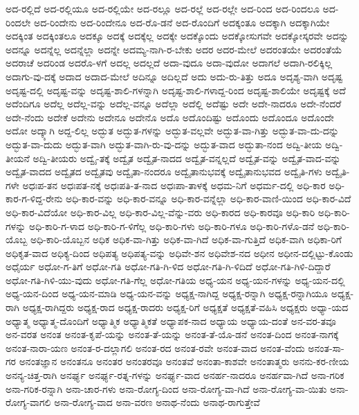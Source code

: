 {ಅದ-ರಲ್ಲಿದೆ
ಅದ-ರಲ್ಲಿಯೂ
ಅದ-ರಲ್ಲಿಯೇ
ಅದ-ರಲ್ಲೂ
ಅದ-ರಲ್ಲೆ
ಅದ-ರಲ್ಲೇ
ಅದ-ರಿಂದ
ಅದ-ರಿಂದಲೂ
ಅದ-ರಿಂದಲೇ
ಅದ-ರಿಂದೇನು
ಅದ-ರಿಂದೇನೂ
ಅದ-ರೊ-ಡನೆ
ಅದ-ರೊಂದಿಗೆ
ಅದಕ್ಕಂತೂ
ಅದಕ್ಕಾಗಿ
ಅದಕ್ಕಾಗಿಯೇ
ಅದಕ್ಕಿಂತ
ಅದಕ್ಕಿಂತಲೂ
ಅದಕ್ಕೂ
ಅದಕ್ಕೆ
ಅದಕ್ಕೆಲ್ಲ
ಅದಕ್ಕೇ
ಅದಕ್ಕೊಂದು
ಅದಕ್ಕೋಸುಗವೇ
ಅದಕ್ಕೋಸ್ಕರವೇ
ಅದನ್ನು
ಅದನ್ನೂ
ಅದನ್ನೆಲ್ಲ
ಅದನ್ನೆಲ್ಲಾ
ಅದನ್ನೇ
ಅದಮ್ಯ-ನಾಗಿ-ರ-ಬೇಕು
ಅದರ
ಅದರ-ಮೇಲೆ
ಅದರಂತಯೇ
ಅದರಂತೆಯೆ
ಅದರಾಚೆ
ಅದರಿಂಡ
ಅದರೊ-ಳಗೆ
ಅದಲ್ಲ
ಅದಲ್ಲದೆ
ಅದಾ-ವುದೂ
ಅದಾ-ವುದೋ
ಅದಾಗಲೆ
ಅದಾಗಿ-ರಲಿಕ್ಕಿಲ್ಲ
ಅದಾಗು-ವು-ದಕ್ಕೆ
ಅದಾದ
ಅದಾದ-ಮೇಲೆ
ಅದಿನ್ನೂ
ಅದಿಲ್ಲದೆ
ಅದು
ಅದು-ರು-ತಿತ್ತು
ಅದೂ
ಅದೃಶ್ಯ-ವಾಗಿ
ಅದೃಷ್ಟ
ಅದೃಷ್ಟ-ದಲ್ಲಿ
ಅದೃಷ್ಟ-ವನ್ನು
ಅದೃಷ್ಟ-ಶಾಲಿ-ಗಳನ್ನಾಗಿ
ಅದೃಷ್ಟ-ಶಾಲಿ-ಗಳಾದ್ದ-ರಿಂದ
ಅದೃಷ್ಟ-ಶಾಲಿಯೇ
ಅದೃಷ್ಟಕ್ಕೆ
ಅದೆ
ಅದೆಂದಿಗೂ
ಅದೆಲ್ಲ
ಅದೆಲ್ಲ-ವನ್ನು
ಅದೆಲ್ಲ-ವನ್ನೂ
ಅದೆಲ್ಲಾ
ಅದೆಲ್ಲಿ
ಅದೆಷ್ಟು
ಅದೇ
ಅದೇ-ನಾದರೂ
ಅದೇ-ನೆಂದರೆ
ಅದೇ-ನೆಂದು
ಅದೇಕೆ
ಅದೇನು
ಅದೇನೂ
ಅದೇನೊ
ಅದೊ
ಅದೊಂದಿಷ್ಟು
ಅದೊಂದು
ಅದೊಂದೂ
ಅದೊಂದೇ
ಅದೋ
ಅದ್ಕ್ಕಾಗಿ
ಅದ್ದ-ಲಿಲ್ಲ
ಅದ್ಭುತ
ಅದ್ಭುತ-ಗಳನ್ನು
ಅದ್ಭುತ-ವಲ್ಲವೇ
ಅದ್ಭುತ-ವಾ-ಗಿತ್ತು
ಅದ್ಭುತ-ವಾ-ದು-ದನ್ನು
ಅದ್ಭುತ-ವಾ-ದುದು
ಅದ್ಭುತ-ವಾಗಿ
ಅದ್ಭುತ-ವಾಗಿ-ರು-ವು-ದನ್ನು
ಅದ್ಭುತ-ವಾದ
ಅದ್ಭುತಾ-ನಂದ
ಅದ್ವಿ-ತೀಯ
ಅದ್ವಿ-ತೀಯನೆ
ಅದ್ವಿ-ತೀಯರು
ಅದ್ವೈ-ತಕ್ಕೆ
ಅದ್ವೈತ
ಅದ್ವೈತ-ನಾದದ
ಅದ್ವೈತ-ವನ್ನಲ್ಲದೆ
ಅದ್ವೈತ-ವನ್ನು
ಅದ್ವೈತ-ವಾದ-ವನ್ನು
ಅದ್ವೈತ-ವಾದದ
ಅದ್ವೈತದ
ಅದ್ವೈತವು
ಅದ್ವೈತಾ-ನಂದರೂ
ಅದ್ವೈತಾನುಭವಕ್ಕೆ
ಅದ್ವೈತಾನುಭವದ
ಅದ್ವೈತಿ-ಗಳು
ಅದ್ವೈತಿ-ಗಳೇ
ಅಧಃಪ-ತನ
ಅಧಃಪತ-ನಕ್ಕೆ
ಅಧಃಪತಿ-ತ-ನಾದ
ಅಧಃಪಾ-ತಾಳಕ್ಕೆ
ಅಧಮ-ನಿಗೆ
ಅಧರ್ಮ-ದಲ್ಲಿ
ಅಧಿ-ಕಾರ
ಅಧಿ-ಕಾರ-ಗ-ಳಿದ್ದ-ರೇನು
ಅಧಿ-ಕಾರ-ವನ್ನು
ಅಧಿ-ಕಾರ-ವನ್ನೂ
ಅಧಿ-ಕಾರ-ವನ್ನೆಲ್ಲಾ
ಅಧಿ-ಕಾರ-ವಾಣಿ-ಯಿಂದ
ಅಧಿ-ಕಾರ-ವಿದೆ
ಅಧಿ-ಕಾರ-ವಿದೆಯೋ
ಅಧಿ-ಕಾರ-ವಿಲ್ಲ
ಅಧಿ-ಕಾರ-ವಿಲ್ಲ-ವೆನ್ನು-ವರು
ಅಧಿ-ಕಾರದ
ಅಧಿ-ಕಾರವೂ
ಅಧಿ-ಕಾರಿ
ಅಧಿ-ಕಾರಿ-ಗಳನ್ನು
ಅಧಿ-ಕಾರಿ-ಗ-ಳಾದ
ಅಧಿ-ಕಾರಿ-ಗ-ಳಿಗೆಲ್ಲ
ಅಧಿ-ಕಾರಿ-ಗಳು
ಅಧಿ-ಕಾರಿ-ಗಳೂ
ಅಧಿ-ಕಾರಿ-ಗಳೊ-ಡನೆ
ಅಧಿ-ಕಾರಿ-ಯೊಬ್ಬ
ಅಧಿ-ಕಾರಿ-ಯೊಬ್ಬನ
ಅಧಿಕ
ಅಧಿಕ-ವಾ-ಗಿತ್ತು
ಅಧಿಕ-ವಾ-ಗಿದೆ
ಅಧಿಕ-ವಾ-ಗುತ್ತಿದೆ
ಅಧಿಕ-ವಾಗಿ
ಅಧಿಕಾ-ರಿಗೆ
ಅಧಿಕೃತ-ವಾದ
ಅಧಿಕ್ಯ-ದಿಂದ
ಅಧಿಪತ್ಯ
ಅಧಿಪತ್ಯ-ವನ್ನು
ಅಧಿವೇ-ಶನ
ಅಧಿವೇಶ-ನದ
ಅಧೀನ
ಅಧೀನ-ದಲ್ಲಿಟ್ಟು-ಕೊಂಡು
ಅಧೈರ್ಯ
ಅಧೋ-ಗ-ತಿಗೆ
ಅಧೋ-ಗತಿ
ಅಧೋ-ಗತಿ-ಗಿ-ಳಿದ
ಅಧೋ-ಗತಿ-ಗಿ-ಳಿದಿದೆ
ಅಧೋ-ಗತಿ-ಗಿಳಿ-ದಿದ್ದಾರೆ
ಅಧೋ-ಗತಿ-ಗಿಳಿ-ಯು-ವುದು
ಅಧೋ-ಗತಿ-ಗೆಲ್ಲ
ಅಧೋ-ಗತಿಯ
ಅಧ್ಯ-ಯನ
ಅಧ್ಯ-ಯನ-ಗಳನ್ನು
ಅಧ್ಯ-ಯನ-ದಲ್ಲಿ
ಅಧ್ಯ-ಯನ-ದಿಂದ
ಅಧ್ಯ-ಯನ-ಮಾಡಿ
ಅಧ್ಯ-ಯನ-ವನ್ನು
ಅಧ್ಯಕ್ಷ-ನಾಗಿದ್ದ
ಅಧ್ಯಕ್ಷ-ರನ್ನಾಗಿ
ಅಧ್ಯಕ್ಷ-ರನ್ನಾಗಿಯೂ
ಅಧ್ಯಕ್ಷ-ರಾಗಿ
ಅಧ್ಯಕ್ಷ-ರಾಗಿದ್ದರು
ಅಧ್ಯಕ್ಷ-ರಾದ
ಅಧ್ಯಕ್ಷ-ರಾದರು
ಅಧ್ಯಕ್ಷ-ರಿಗೆ
ಅಧ್ಯಕ್ಷತೆ
ಅಧ್ಯಕ್ಷತೆ-ವಹಿಸಿ
ಅಧ್ಯಕ್ಷರು
ಅಧ್ಯಾ-ಯದ
ಅಧ್ಯಾತ್ಮ
ಅಧ್ಯಾತ್ಮ-ದೊಂದಿಗೆ
ಅಧ್ಯಾತ್ಮಿಕ
ಅಧ್ಯಾತ್ಮಿಕತೆ
ಅಧ್ಯಾಪಕ-ನಾದ
ಅಧ್ಯಾಯ
ಅಧ್ಯಾಯ-ದಂತೆ
ಅನ-ವರ-ತವೂ
ಅನ-ವರತ
ಅನಂತ
ಅನಂತ-ಕೃಪೆ-ಯನ್ನು
ಅನಂತ-ತೆ-ಯನ್ನು
ಅನಂತ-ತೆ-ಯೊ-ಡನೆ
ಅನಂತ-ದಿಂದ
ಅನಂತ-ನಾಗಕ್ಕೆ
ಅನಂತ-ನಾರಾ-ಯಣ
ಅನಂತ-ರ-ದಲ್ಲಾಗಲಿ
ಅನಂತ-ರದ
ಅನಂತ-ರವೇ
ಅನಂತ-ವಾದ
ಅನಂತ-ವೆಂದು
ಅನಂತ-ಸಾ-ಗರ
ಅನಂತಜ್ಞಾನ
ಅನಂತನೂ
ಅನಂತರ
ಅನಂತರವೂ
ಅನಂತವೆ
ಅನಂತಾ-ಕಾಶವೇ
ಅನಂತಾತ್ಮರು
ಅನನು-ಕರ-ಣೀಯ
ಅನನ್ಯ-ಚಿತ್ತ-ರಾಗಿ
ಅನರ್ಘ್ಯ
ಅನರ್ಘ್ಯ-ರತ್ನ-ಗಳನ್ನು
ಅನರ್ಘ್ಯ-ವಾದ
ಅನರ್ಹ-ನಾದರೂ
ಅನರ್ಹವಾ-ಗಿದೆ
ಅನಾ-ಗರಿಕ
ಅನಾ-ಗರಿಕ-ರನ್ನಾಗಿ
ಅನಾ-ಚಾರ-ಗಳು
ಅನಾ-ರೋಗ್ಯ-ದಿಂದ
ಅನಾ-ರೋಗ್ಯ-ವಾ-ಗಿದೆ
ಅನಾ-ರೋಗ್ಯ-ವಾ-ಯಿತು
ಅನಾ-ರೋಗ್ಯ-ವಾಗಲಿ
ಅನಾ-ರೋಗ್ಯ-ವಾದ
ಅನಾ-ವರಣ
ಅನಾಥ-ನೆಂದು
ಅನಾಥ-ರಾಗುತ್ತೇವೆ
}
